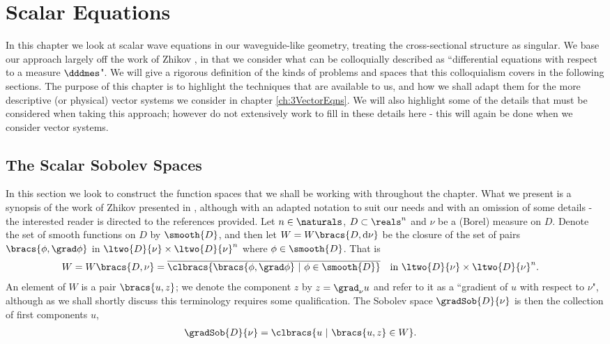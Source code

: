 \chapter{Scalar Equations} \label{ch:2ScalarEqns}
In this chapter we look at scalar wave equations in our waveguide-like geometry, treating the cross-sectional structure as singular.
We base our approach largely off the work of Zhikov \cite{zhikov2000extension}, in that we consider what can be colloquially described as ``differential equations with respect to a measure $\dddmes$".
We will give a rigorous definition of the kinds of problems and spaces that this colloquialism covers in the following sections.
The purpose of this chapter is to highlight the techniques that are available to us, and how we shall adapt them for the more descriptive (or physical) vector systems we consider in chapter \ref{ch:3VectorEqns}.
We will also highlight some of the details that must be considered when taking this approach; however do not extensively work to fill in these details here - this will again be done when we consider vector systems.

\section{The Scalar Sobolev Spaces} \label{sec:ScalarSobSpaces}
In this section we look to construct the function spaces that we shall be working with throughout the chapter.
What we present is a synopsis of the work of Zhikov presented in , although with an adapted notation to suit our needs and with an omission of some details - the interested reader is directed to the references provided. 
Let $n\in\naturals$, $D\subset\reals^n$ and $\nu$ be a (Borel) measure on $D$.
Denote the set of smooth functions on $D$ by $\smooth{D}$, and then let $W=W\bracs{D,\mathrm{d}\nu}$ be the closure of the set of pairs $\bracs{\phi,\grad\phi}$ in $\ltwo{D}{\nu}\times\ltwo{D}{\nu}^n$ where $\phi\in\smooth{D}$.
That is
\begin{align*}
	W = W\bracs{D,\nu} &= \overline{\clbracs{\bracs{\phi,\grad\phi} \ \vert \ \phi\in\smooth{D}}} \quad \text{in} \ \ltwo{D}{\nu}\times\ltwo{D}{\nu}^n.
\end{align*}
An element of $W$ is a pair $\bracs{u,z}$; we denote the component $z$ by $z=\grad_\nu u$ and refer to it as a ``gradient of $u$ with respect to $\nu$", although as we shall shortly discuss this terminology requires some qualification.
The Sobolev space $\gradSob{D}{\nu}$ is then the collection of first components $u$,
\begin{align*}
	\gradSob{D}{\nu} &= \clbracs{u \ \vert \ \bracs{u,z}\in W}.
\end{align*}

